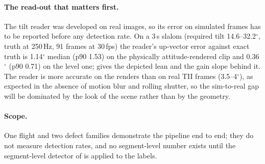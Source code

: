 \paragraph{The read-out that matters first.} The tilt reader was developed on real images, so
its error on simulated frames has to be reported before any detection rate. On a 3\,s slalom
(required tilt 14.6--32.2$^\circ$, truth at 250\,Hz, 91 frames at 30\,fps) the reader's
up-vector error against exact truth is 1.14$^\circ$ median (p90 1.53) on the physically
attitude-rendered clip and 0.36$^\circ$ (p90 0.71) on the level one;
 gives the depicted lean and the gain slope behind it. The reader is more
accurate on the renders than on real TII frames (3.5--4$^\circ$), as expected in the absence
of motion blur and rolling shutter, so the sim-to-real gap will be dominated by the look of
the scene rather than by the geometry.

\paragraph{Scope.} One flight and two defect families demonstrate the pipeline end to end;
they do not measure detection rates, and no segment-level number exists until the
segment-level detector of  is applied to the labels.
